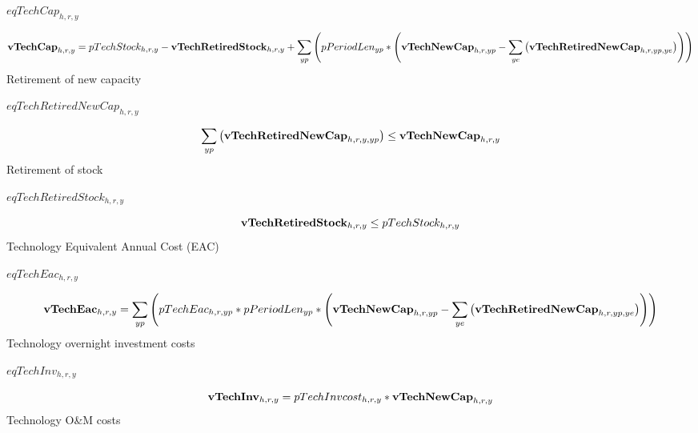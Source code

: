 \documentclass{article}
\begin{document}
$eqTechCap_{h,r,y}$





\begin{dmath} 
{\bf vTechCap}_{h,r,y}  =  pTechStock_{h,r,y}-{\bf vTechRetiredStock}_{h,r,y}+\sum_{yp}{\left(pPeriodLen_{yp}*\left({\bf vTechNewCap}_{h,r,yp}-\sum_{ye}{\left({\bf vTechRetiredNewCap}_{h,r,yp,ye}\right)}\right)\right)}
\end{dmath} 
Retirement of new capacity







$eqTechRetiredNewCap_{h,r,y}$





\begin{dmath} 
\sum_{yp}{\left({\bf vTechRetiredNewCap}_{h,r,y,yp}\right)}  \le  {\bf vTechNewCap}_{h,r,y}
\end{dmath} 
Retirement of stock







$eqTechRetiredStock_{h,r,y}$





\begin{dmath} 
{\bf vTechRetiredStock}_{h,r,y}  \le  pTechStock_{h,r,y}
\end{dmath} 
Technology Equivalent Annual Cost (EAC)







$eqTechEac_{h,r,y}$





\begin{dmath} 
{\bf vTechEac}_{h,r,y}  =  \sum_{yp}{\left(pTechEac_{h,r,yp}*pPeriodLen_{yp}*\left({\bf vTechNewCap}_{h,r,yp}-\sum_{ye}{\left({\bf vTechRetiredNewCap}_{h,r,yp,ye}\right)}\right)\right)}
\end{dmath} 
Technology overnight investment costs







$eqTechInv_{h,r,y}$





\begin{dmath} 
{\bf vTechInv}_{h,r,y}  =  pTechInvcost_{h,r,y}*{\bf vTechNewCap}_{h,r,y}
\end{dmath} 
Technology O\&M costs
\end{document}
